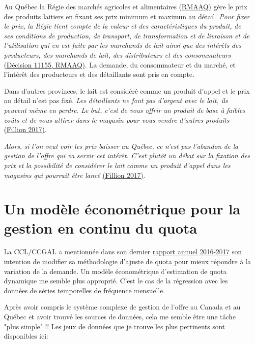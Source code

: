\documentclass[11pt]{article}
\begin{document}
    Au Québec la Régie des marchés agricoles et alimentaires
(\href{http://www.rmaaq.gouv.qc.ca//index.php?id=49}{RMAAQ}) gère le
prix des produits laitiers en fixant ses prix minimum et maximun au
détail. \emph{Pour fixer le prix, la Régie tient compte de la valeur et
des caractéristiques du produit, de ses conditions de production, de
transport, de transformation et de livraison et de l'utilisation qui en
est faite par les marchands de lait ainsi que des intérêts des
producteurs, des marchands de lait, des distributeurs et des
consommateurs}
\href{http://www.rmaaq.gouv.qc.ca/fileadmin/DocuCentre/Decision/2017/11155.pdf}{(Décision
11155, RMAAQ)}. La demande, du consommateur et du marché, et l'intérêt
des producteurs et des détaillants sont pris en compte.

Dans d'autres provinces, le lait est considéré comme un produit d'appel
et le prix au détail n'est pas fixé. \emph{Les détaillants ne font pas
d'argent avec le lait, ils peuvent même en perdre. Le but, c'est de vous
offrir un produit de base à faibles coûts et de vous attirer dans le
magasin pour vous vendre d'autres produits}
\href{https://ici.radio-canada.ca/nouvelle/1036806/gestion-de-offre-pourquoi-lait-coute-plus-cher-au-quebec}{(Fillion
2017)}.

\emph{Alors, si l'on veut voir les prix baisser au Québec, ce n'est pas
l'abandon de la gestion de l'offre qui va servir cet intérêt. C'est
plutôt un débat sur la fixation des prix et la possibilité de considérer
le lait comme un produit d'appel dans les magasins qui pourrait être
lancé}
\href{https://ici.radio-canada.ca/nouvelle/1036806/gestion-de-offre-pourquoi-lait-coute-plus-cher-au-quebec}{(Fillion
2017)}.

    \section{Un modèle économétrique pour la gestion en continu du
quota}\label{un-moduxe8le-uxe9conomuxe9trique-pour-la-gestion-en-continu-du-quota}

La CCL/CCGAL a mentionnée dans son dernier
\href{http://www.cdc-ccl.gc.ca/CDC/index-fra.php?link=125}{rapport
annuel 2016-2017} son intention de modifier sa méthodologie d'ajuste de
quota pour mieux répondre à la variation de la demande. Un modèle
économétrique d'estimation de quota dynamique me semble plus approprié.
C'est le cas de la régression avec les données de séries temporelles de
fréquence mensuelle.

Après avoir compris le système complexe de gestion de l'offre au Canada
et au Québec et avoir trouvé les sources de données, cela me semble être
une tâche "plus simple" !! Les jeux de données que je trouve les plus
pertinents sont disponibles ici:
\end{document}
